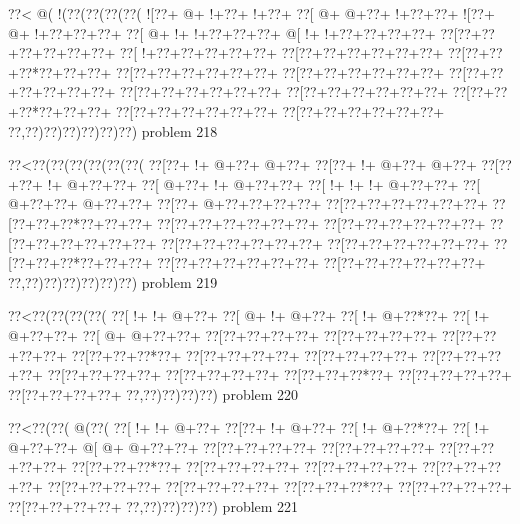 \vbox{\vbox{\goo
\0??<\- @(\- !(\0??(\0??(\0??(\0??(
\- ![\0??+\- @+\- !+\0??+\- !+\0??+
\0??[\- @+\- @+\0??+\- !+\0??+\0??+
\- ![\0??+\- @+\- !+\0??+\0??+\0??+
\0??[\- @+\- !+\- !+\0??+\0??+\0??+
\- @[\- !+\- !+\0??+\0??+\0??+\0??+
\0??[\0??+\0??+\0??+\0??+\0??+\0??+
\0??[\- !+\0??+\0??+\0??+\0??+\0??+
\0??[\0??+\0??+\0??+\0??+\0??+\0??+
\0??[\0??+\0??+\0??*\0??+\0??+\0??+
\0??[\0??+\0??+\0??+\0??+\0??+\0??+
\0??[\0??+\0??+\0??+\0??+\0??+\0??+
\0??[\0??+\0??+\0??+\0??+\0??+\0??+
\0??[\0??+\0??+\0??+\0??+\0??+\0??+
\0??[\0??+\0??+\0??+\0??+\0??+\0??+
\0??[\0??+\0??+\0??*\0??+\0??+\0??+
\0??[\0??+\0??+\0??+\0??+\0??+\0??+
\0??[\0??+\0??+\0??+\0??+\0??+\0??+
\0??,\0??)\0??)\0??)\0??)\0??)\0??)
}
\hfil problem 218\hfil\break
}

\vbox{\vbox{\goo
\0??<\0??(\0??(\0??(\0??(\0??(\0??(
\0??[\0??+\- !+\- @+\0??+\- @+\0??+
\0??[\0??+\- !+\- @+\0??+\- @+\0??+
\0??[\0??+\0??+\- !+\- @+\0??+\0??+
\0??[\- @+\0??+\- !+\- @+\0??+\0??+
\0??[\- !+\- !+\- !+\- @+\0??+\0??+
\0??[\- @+\0??+\0??+\- @+\0??+\0??+
\0??[\0??+\- @+\0??+\0??+\0??+\0??+
\0??[\0??+\0??+\0??+\0??+\0??+\0??+
\0??[\0??+\0??+\0??*\0??+\0??+\0??+
\0??[\0??+\0??+\0??+\0??+\0??+\0??+
\0??[\0??+\0??+\0??+\0??+\0??+\0??+
\0??[\0??+\0??+\0??+\0??+\0??+\0??+
\0??[\0??+\0??+\0??+\0??+\0??+\0??+
\0??[\0??+\0??+\0??+\0??+\0??+\0??+
\0??[\0??+\0??+\0??*\0??+\0??+\0??+
\0??[\0??+\0??+\0??+\0??+\0??+\0??+
\0??[\0??+\0??+\0??+\0??+\0??+\0??+
\0??,\0??)\0??)\0??)\0??)\0??)\0??)
}
\hfil problem 219\hfil\break
}

\vbox{\vbox{\goo
\0??<\0??(\0??(\0??(\0??(
\0??[\- !+\- !+\- @+\0??+
\0??[\- @+\- !+\- @+\0??+
\0??[\- !+\- @+\0??*\0??+
\0??[\- !+\- @+\0??+\0??+
\0??[\- @+\- @+\0??+\0??+
\0??[\0??+\0??+\0??+\0??+
\0??[\0??+\0??+\0??+\0??+
\0??[\0??+\0??+\0??+\0??+
\0??[\0??+\0??+\0??*\0??+
\0??[\0??+\0??+\0??+\0??+
\0??[\0??+\0??+\0??+\0??+
\0??[\0??+\0??+\0??+\0??+
\0??[\0??+\0??+\0??+\0??+
\0??[\0??+\0??+\0??+\0??+
\0??[\0??+\0??+\0??*\0??+
\0??[\0??+\0??+\0??+\0??+
\0??[\0??+\0??+\0??+\0??+
\0??,\0??)\0??)\0??)\0??)
}
\hfil problem 220\hfil\break
}

\vbox{\vbox{\goo
\0??<\0??(\0??(\- @(\0??(
\0??[\- !+\- !+\- @+\0??+
\0??[\0??+\- !+\- @+\0??+
\0??[\- !+\- @+\0??*\0??+
\0??[\- !+\- @+\0??+\0??+
\- @[\- @+\- @+\0??+\0??+
\0??[\0??+\0??+\0??+\0??+
\0??[\0??+\0??+\0??+\0??+
\0??[\0??+\0??+\0??+\0??+
\0??[\0??+\0??+\0??*\0??+
\0??[\0??+\0??+\0??+\0??+
\0??[\0??+\0??+\0??+\0??+
\0??[\0??+\0??+\0??+\0??+
\0??[\0??+\0??+\0??+\0??+
\0??[\0??+\0??+\0??+\0??+
\0??[\0??+\0??+\0??*\0??+
\0??[\0??+\0??+\0??+\0??+
\0??[\0??+\0??+\0??+\0??+
\0??,\0??)\0??)\0??)\0??)
}
\hfil problem 221\hfil\break
}

